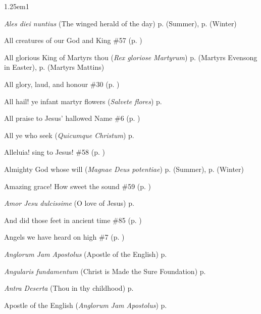 \begin{hangparas}{1.25em}{1}
\par\noindent
\textit{Ales diei nuntius} (The winged herald of the day) \dotfill p. \pageref{TuesdayMattinsSummer} (Summer), p. \pageref{TuesdayMattinsWinter} (Winter)
\par\noindent
All creatures of our God and King \dotfill \#57 (p. \pageref{Hymn57})
\par\noindent
All glorious King of Martyrs thou (\textit{Rex gloriose Martyrum}) \dotfill p. \pageref{MartyrsEvensongEaster} (Martyrs Evensong in Easter), p. \pageref{MartyrsMattins} (Martyrs Mattins)
\par\noindent
All glory, laud, and honour \dotfill \#30 (p. \pageref{Hymn30})
\par\noindent
All hail! ye infant martyr flowers (\textit{Salvete flores}) \dotfill p. \pageref{HolyInnocentsMattinsHymn}
\par\noindent
All praise to Jesus' hallowed Name \dotfill \#6 (p. \pageref{Hymn6})
\par\noindent
All ye who seek (\textit{Quicumque Christum}) \dotfill p. \pageref{TransfigurationEvensong}
\par\noindent
Alleluia! sing to Jesus!  \dotfill \#58 (p. \pageref{Hymn58})
\par\noindent
Almighty God whose will (\textit{Magnae Deus potentiae}) \dotfill p. \pageref{ThursdayEvensongSummer} (Summer), p. \pageref{ThursdayEvensongWinter} (Winter)
\par\noindent
Amazing grace! How sweet the sound \dotfill \#59 (p. \pageref{Hymn59})
\par\noindent
\textit{Amor Jesu dulcissime} (O love of Jesus) \dotfill p. \pageref{TransfigurationMattins}
\par\noindent
And did those feet in ancient time \dotfill \#85 (p. \pageref{Hymn85})
\par\noindent
Angels we have heard on high \dotfill \#7 (p. \pageref{Hymn7})
\par\noindent
\textit{Anglorum Jam Apostolus} (Apostle of the English) \dotfill p. \pageref{GregoryEvensong}
\par\noindent
\textit{Angularis fundamentum} (Christ is Made the Sure Foundation) \dotfill p. \pageref{DedicationMattins}
\par\noindent
\textit{Antra Deserta} (Thou in thy childhood) \dotfill p. \pageref{JohnBaptistInvitatory}
\par\noindent
Apostle of the English (\textit{Anglorum Jam Apostolus}) \dotfill p. \pageref{GregoryEvensong}
\par\noindent

\end{hangparas}
